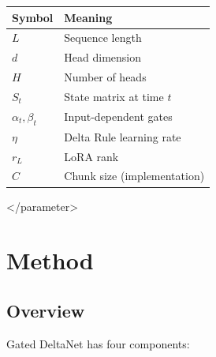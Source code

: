 \begin{table}[H]
\centering
\small
\begin{tabular}{ll}
\toprule
\textbf{Symbol} & \textbf{Meaning} \\
\midrule
$L$ & Sequence length \\
$d$ & Head dimension \\
$H$ & Number of heads \\
$S_t$ & State matrix at time $t$ \\
$\alpha_t, \beta_t$ & Input-dependent gates \\
$\eta$ & Delta Rule learning rate \\
$r_L$ & LoRA rank \\
$C$ & Chunk size (implementation) \\
\bottomrule
\end{tabular}
\end{table}
\textless{}/parameter\textgreater{}




\section{Method}

\subsection{Overview}

Gated DeltaNet has four components:


